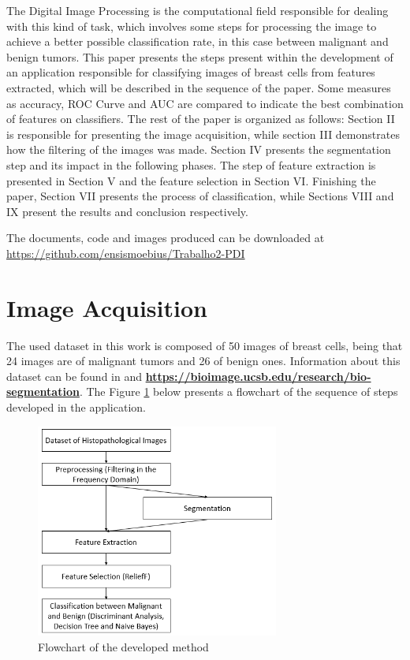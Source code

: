 \documentclass[conference]{IEEEtran}
\begin{document}
		\par The Digital Image Processing is the computational field responsible for dealing with this kind of task, which involves some steps for processing the image to achieve a better possible classification rate, in this case between malignant and benign tumors. This paper presents the steps present within the development of an application responsible for classifying images of breast cells from features extracted, which will be described in the sequence of the paper. Some measures as accuracy, ROC Curve and AUC are compared to indicate the best combination of features on classifiers. The rest of the paper is organized as follows:  Section II is responsible for presenting the image acquisition, while section III demonstrates how the filtering of the images was made. Section IV presents the segmentation step and its impact in the following phases. The step of feature extraction is presented in Section V and the feature selection in Section VI. Finishing the paper, Section VII presents the process of classification, while Sections VIII and IX present the results and conclusion respectively.
		
		\par The documents, code and images produced can be downloaded at \url{https://github.com/ensismoebius/Trabalho2-PDI}

	\section{Image Acquisition}
		\par The used dataset in this work is composed of 50 images of breast cells, being that 24 images are of malignant tumors and 26 of benign ones. Information about this dataset can be found in \cite{artigo_database} and \href{https://bioimage.ucsb.edu/research/bio-segmentation}{\textbf{https://bioimage.ucsb.edu/research/bio-segmentation}}. The Figure \ref{fig:imagem3} below presents a flowchart of the sequence of steps developed in the application.
		
		\begin{figure}[h]
		    \centering
		    \includegraphics[width=8cm]{images/imagem3.png}
		    \caption{Flowchart of the developed method}
		    \label{fig:imagem3}
		\end{figure}
\end{document}
